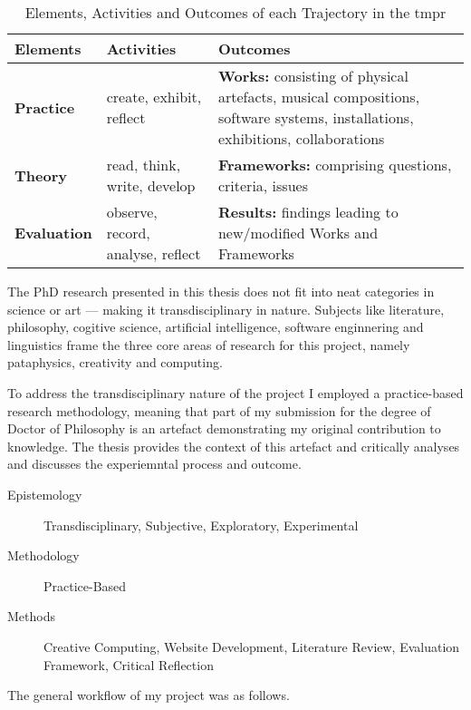 \begin{table}[htb]
  \begin{tabu}{X[1]X[2]X[3]}
  \toprule
  \textbf{Elements}
  &
  \textbf{Activities}
  &
  \textbf{Outcomes}
  \\ \midrule
  \textbf{Practice}
  &
  create, exhibit, reflect
  &
  \textbf{Works:} consisting of physical artefacts, musical compositions, software systems, installations, exhibitions, collaborations
  \\ \midrule
  \textbf{Theory}
  &
  read, think, write, develop
  &
  \textbf{Frameworks:} comprising questions, criteria, issues
  \\ \midrule
  \textbf{Evaluation}
  &
  observe, record, analyse, reflect
  &
  \textbf{Results:} findings leading to new/modified Works and Frameworks
  \\ \bottomrule
  \end{tabu}
\caption[Elements, Activities and Outcomes of the \gls{tmpr}]{Elements, Activities and Outcomes of each Trajectory in the \gls{tmpr}}
\label{tab:tmpr}
\end{table}


\spirals %


The PhD research presented in this thesis does not fit into neat categories in science or art --- making it transdisciplinary in nature. Subjects like literature, philosophy, cogitive science, artificial intelligence, software enginnering and linguistics frame the three core areas of research for this project, namely pataphysics, creativity and computing.

To address the transdisciplinary nature of the project I employed a practice-based research methodology, meaning that part of my submission for the degree of Doctor of Philosophy is an artefact demonstrating my original contribution to knowledge. The thesis provides the context of this artefact and critically analyses and discusses the experiemntal process and outcome.

\begin{description}
  \item [Epistemology] Transdisciplinary, Subjective, Exploratory, Experimental
  \item [Methodology] Practice-Based
  \item [Methods] Creative Computing, Website Development, Literature Review, Evaluation Framework, Critical Reflection
\end{description}

The general workflow of my project was as follows.


